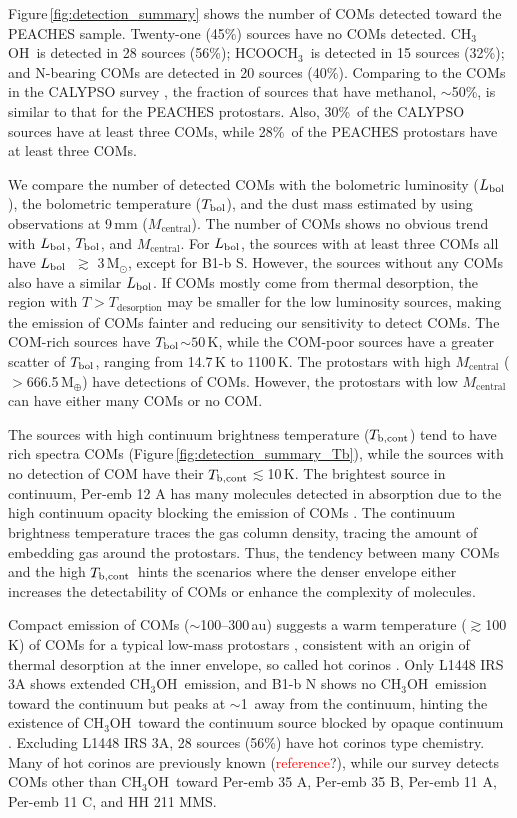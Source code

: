 \documentclass[twocolumn]{aastex62}
\newcommand{\msun}{\mbox{\,M$_\odot$}}
\newcommand{\mearth}{\mbox{\,M$_\oplus$}}
\newcommand{\lbol}{\mbox{$L_{\rm bol}$}}
\newcommand{\tbol}{\mbox{$T_{\rm bol}$}}
\newcommand{\tbc}{\mbox{$T_{\rm b, cont}$}}
\newcommand{\methylformate}{\mbox{HCOOCH$_{3}$}}
\newcommand{\methanol}{\mbox{CH$_{3}$OH}}
\newcommand{\refnote}{\textcolor{red}{reference}}
\begin{document}
Figure\,\ref{fig:detection_summary} shows the number of COMs detected toward the PEACHES sample.  Twenty-one (45\%) sources have no COMs detected.  \methanol\ is detected in 28 sources (56\%); \methylformate\ is detected in 15 sources (32\%); and N-bearing COMs are detected in 20 sources (40\%).  Comparing to the COMs in the CALYPSO survey \citep{2020A&A...635A.198B}, the fraction of sources that have methanol, $\sim$50\%, is similar to that for the PEACHES protostars.  Also, 30\%\ of the CALYPSO sources have at least three COMs, while 28\%\ of the PEACHES protostars have at least three COMs.  

We compare the number of detected COMs with the bolometric luminosity (\lbol), the bolometric temperature (\tbol), and the dust mass estimated by \citet{2020arXiv200602812T} using observations at 9\,mm ($M_\text{central}$).  The number of COMs shows no obvious trend with \lbol, \tbol, and $M_\text{central}$.  For \lbol, the sources with at least three COMs all have \lbol\ $\gtrsim$ 3\msun, except for B1-b S.  However, the sources without any COMs also have a similar \lbol.  If COMs mostly come from thermal desorption, the region with $T > T_\text{desorption}$ may be smaller for the low luminosity sources, making the emission of COMs fainter and reducing our sensitivity to detect COMs.
The COM-rich sources have \tbol$\sim 50$\,K, while the COM-poor sources have a greater scatter of \tbol, ranging from 14.7\,K to 1100\,K.  The protostars with high $M_\text{central}$ ($>$666.5\mearth) have detections of COMs.  However, the protostars with low $M_\text{central}$ can have either many COMs or no COM.

The sources with high continuum brightness temperature (\tbc) tend to have rich spectra COMs (Figure\,\ref{fig:detection_summary_Tb}), while the sources with no detection of COM have their \tbc$\lesssim$10\,K.  The brightest source in continuum, Per-emb 12 A has many molecules detected in absorption due to the high continuum opacity blocking the emission of COMs \citep{2019ApJ...872..196S,2020ApJ...896L...3D}.  The continuum brightness temperature traces the gas column density, tracing the amount of embedding gas around the protostars.  
Thus, the tendency between many COMs and the high \tbc\ hints the scenarios where the denser envelope either increases the detectability of COMs or enhance the complexity of molecules.

Compact emission of COMs ($\sim$100--300\,au) suggests a warm temperature ($\gtrsim$100\,K) of COMs for a typical low-mass protostars \citep[e.g. ][]{2017ApJ...835..259Y}, consistent with an origin of thermal desorption at the inner envelope, so called hot corinos \citep{2004ASPC..323..195C}.  Only L1448 IRS 3A shows extended \methanol\ emission, and B1-b N shows no \methanol\ emission toward the continuum but peaks at $\sim$1\arcsec\ away from the continuum, hinting the existence of \methanol\ toward the continuum source blocked by opaque continuum \citep{2018A&A...620A..80M}.  Excluding L1448 IRS 3A, 28 sources (56\%) have hot corinos type chemistry.  Many of hot corinos are previously known (\refnote?), while our survey detects COMs other than \methanol\ toward Per-emb 35 A, Per-emb 35 B, Per-emb 11 A, Per-emb 11 C, and HH 211 MMS.
\end{document}
